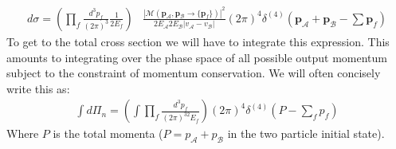 \documentclass[11pt]{article}
\numberwithin{equation}{section}
\begin{document}
\begin{itemize}
     \begin{align}
        d\sigma = \left(\prod_f \frac{d^3p_f}{(2\pi)^3}\frac{1}{2E_f}\right)&\frac{|\mathcal{M}(\textbf{p}_{\mathcal{A}},\textbf{p}_{\mathcal{B}} \rightarrow \{\textbf{p}_f\})|^2}{2E_{\mathcal{A}}2E_{\mathcal{B}}|v_{\mathcal{A}}-v_{\mathcal{B}}|}(2\pi)^4\delta^{(4)}\left(\textbf{p}_{\mathcal{A}}+\textbf{p}_{\mathcal{B}} - \sum \textbf{p}_f\right)
      \end{align} 
      To get to the total cross section we will have to integrate this expression. This amounts to integrating over the phase space of all possible output momentum subject to the constraint of momentum conservation. We will often concisely write this as:
          \begin{align}
          \label{Pi_n}
          \int d\Pi_n = \left(\int \prod _f\frac{d^3p_f}{(2\pi)^32E_f}\right)(2\pi)^4\delta^{(4)}(P - \sum_fp_f)
      \end{align} 
      Where $P$ is the total momenta ($P= p_{\mathcal{A}}+p_{\mathcal{B}}$ in the two particle initial state).
        \end{itemize}
\end{document}
